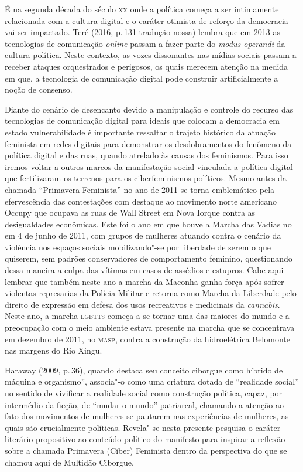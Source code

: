 É na segunda década do século \textsc{xx} onde a política começa a ser
intimamente relacionada com a cultura digital e o caráter otimista de
reforço da democracia vai ser impactado. Teré (2016, p.\,131 tradução
nossa) lembra que em 2013 as tecnologias de comunicação \emph{online} passam a
fazer parte do \emph{modus operandi} da cultura política. Neste
contexto, as vozes dissonantes nas mídias sociais passam a receber
ataques orquestrados e perigosos, os quais merecem atenção na medida em
que, a tecnologia de comunicação digital pode construir artificialmente
a noção de consenso.

Diante do cenário de desencanto devido a manipulação e controle do
recurso das tecnologias de comunicação digital para ideais que colocam a
democracia em estado vulnerabilidade é importante ressaltar o trajeto
histórico da atuação feminista em redes digitais para demonstrar os
desdobramentos do fenômeno da política digital e das ruas, quando
atrelado às causas dos feminismos. Para isso iremos voltar a outros
marcos da manifestação social vinculada a política digital que
fertilizaram os terrenos para os ciberfeminismos políticos. Mesmo antes
da chamada ``Primavera Feminista'' no ano de 2011 se torna emblemático
pela efervescência das contestações com destaque ao movimento norte
americano Occupy que ocupava as ruas de Wall Street em Nova Iorque
contra as desigualdades econômicas. Este foi o ano em que houve a Marcha
das Vadias no em 4 de junho de 2011, com grupos de mulheres atuando
contra o cenário da violência nos espaços sociais mobilizando"-se por
liberdade de serem o que quiserem, sem padrões conservadores de
comportamento feminino, questionando dessa maneira a culpa das vítimas
em casos de assédios e estupros. Cabe aqui lembrar que também neste ano
a marcha da Maconha ganha força após sofrer violentas represarias da
Polícia Militar e retorna como Marcha da Liberdade pelo direito de
expressão em defesa dos usos recreativos e medicinais da
\emph{cannabis}. Neste ano, a marcha \textsc{lgbtts} começa a se tornar uma das
maiores do mundo e a preocupação com o meio ambiente estava presente na
marcha que se concentrava em dezembro de 2011, no \textsc{masp}, contra a
construção da hidroelétrica Belomonte nas margens do Rio Xingu.

Haraway (2009, p.\,36), quando destaca seu conceito ciborgue como híbrido
de máquina e organismo'', associa"-o como uma criatura dotada de
``realidade social'' no sentido de vivificar a realidade social como
construção política, capaz, por intermédio da ficção, de ``mudar o
mundo'' patriarcal, chamando a atenção ao fato dos movimentos de
mulheres se pautarem nas experiências de mulheres, as quais são
crucialmente políticas. Revela"-se nesta presente pesquisa o caráter
literário propositivo ao conteúdo político do manifesto para inspirar a
reflexão sobre a chamada Primavera (Ciber) Feminista dentro da
perspectiva do que se chamou aqui de Multidão Ciborgue.

